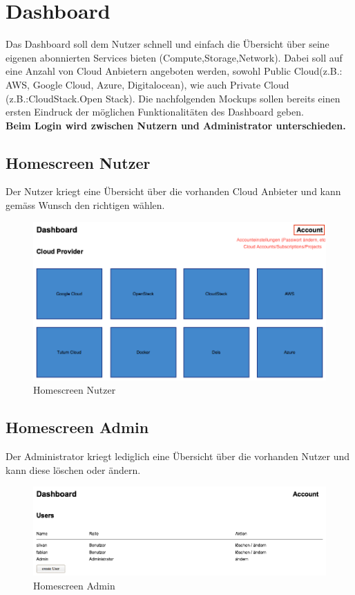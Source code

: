 \newpage
\section{Dashboard}
Das Dashboard soll dem Nutzer schnell und einfach die Übersicht über seine 
eigenen abonnierten Services bieten (Compute,Storage,Network).
Dabei soll auf eine Anzahl von Cloud Anbietern angeboten werden, sowohl Public 
Cloud(z.B.: AWS, Google Cloud, Azure, Digitalocean), wie auch Private Cloud (z.B.:CloudStack.Open 
Stack).
Die nachfolgenden Mockups sollen bereits einen ersten Eindruck der 
möglichen Funktionalitäten des Dashboard geben.
\\
\textbf{Beim Login wird zwischen Nutzern und Administrator unterschieden.}

\subsection{Homescreen Nutzer}
Der Nutzer kriegt eine Übersicht über die vorhanden Cloud Anbieter und kann 
gemäss Wunsch den richtigen wählen.
\begin{figure}[!htbp]
\includegraphics[width=\textwidth]{./03_Analyse/03_Dashboard/images/homescreen_user}
\caption{Homescreen Nutzer}
\end{figure}

\newpage

\subsection{Homescreen Admin}

Der Administrator kriegt lediglich eine Übersicht über die vorhanden Nutzer und 
kann diese löschen oder ändern.
\begin{figure}[!htbp]
  \includegraphics[width=\textwidth]{./03_Analyse/03_Dashboard/images/homescreen_admin}
  \caption{Homescreen Admin}
\end{figure}


